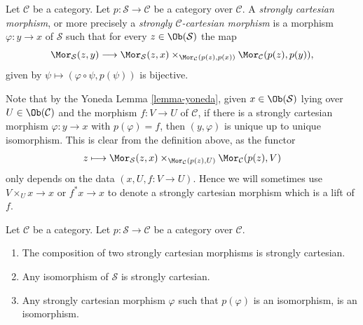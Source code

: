 \begin{definition}
\label{definition-cartesian-over-C}
Let $\mathcal{C}$ be a category.
Let $p : \mathcal{S} \to \mathcal{C}$ be a category over $\mathcal{C}$.
A {\it strongly cartesian morphism}, or more precisely a
{\it strongly $\mathcal{C}$-cartesian morphism} is a
morphism $\varphi : y \to x$ of $\mathcal{S}$ such that
for every $z \in \Ob(\mathcal{S})$ the map
$$
\Mor_\mathcal{S}(z, y)
\longrightarrow
\Mor_\mathcal{S}(z, x)
\times_{\Mor_\mathcal{C}(p(z), p(x))}
\Mor_\mathcal{C}(p(z), p(y)),
$$
given by $\psi \longmapsto (\varphi \circ \psi, p(\psi))$
is bijective.
\end{definition}

\noindent
Note that by the Yoneda Lemma \ref{lemma-yoneda}, given
$x \in \Ob(\mathcal{S})$ lying over $U \in \Ob(\mathcal{C})$
and the morphism $f : V \to U$ of $\mathcal{C}$, if there is a
strongly cartesian morphism $\varphi : y \to x$ with $p(\varphi) = f$,
then $(y, \varphi)$ is unique up to unique isomorphism. This is
clear from the definition above, as the functor
$$
z
\longmapsto
\Mor_\mathcal{S}(z, x)
\times_{\Mor_\mathcal{C}(p(z), U)}
\Mor_\mathcal{C}(p(z), V)
$$
only depends on the data $(x, U, f : V \to U)$. Hence we
will sometimes use $V \times_U x \to x$ or $f^*x \to x$
to denote a strongly cartesian morphism which is a lift of $f$.

\begin{lemma}
\label{lemma-composition-cartesian}
Let $\mathcal{C}$ be a category.
Let $p : \mathcal{S} \to \mathcal{C}$ be a category over $\mathcal{C}$.
\begin{enumerate}
\item The composition of two strongly cartesian morphisms
is strongly cartesian.
\item Any isomorphism of $\mathcal{S}$ is strongly cartesian.
\item Any strongly cartesian morphism $\varphi$ such that $p(\varphi)$
is an isomorphism, is an isomorphism.
\end{enumerate}
\end{lemma}

